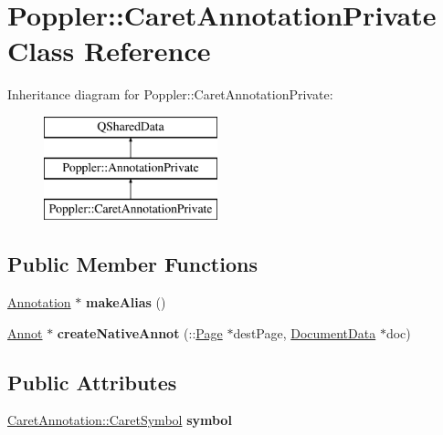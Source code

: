\hypertarget{class_poppler_1_1_caret_annotation_private}{}\section{Poppler\+:\+:Caret\+Annotation\+Private Class Reference}
\label{class_poppler_1_1_caret_annotation_private}
Inheritance diagram for Poppler\+:\+:Caret\+Annotation\+Private\+:\begin{figure}[H]
\begin{center}
\leavevmode
\includegraphics[height=3.000000cm]{class_poppler_1_1_caret_annotation_private}
\end{center}
\end{figure}
\subsection*{Public Member Functions}
\begin{DoxyCompactItemize}
\item 
\mbox{\label{class_poppler_1_1_caret_annotation_private_abfd2f73ff6e6a29321aae98d848281ed}} 
\hyperlink{class_poppler_1_1_annotation}{Annotation} $\ast$ {\bfseries make\+Alias} ()
\item 
\mbox{\label{class_poppler_1_1_caret_annotation_private_a1508cb16d1c94c3ecbc49f1d6f2beba6}} 
\hyperlink{class_annot}{Annot} $\ast$ {\bfseries create\+Native\+Annot} (\+::\hyperlink{class_poppler_1_1_page}{Page} $\ast$dest\+Page, \hyperlink{class_poppler_1_1_document_data}{Document\+Data} $\ast$doc)
\end{DoxyCompactItemize}
\subsection*{Public Attributes}
\begin{DoxyCompactItemize}
\item 
\mbox{\label{class_poppler_1_1_caret_annotation_private_af63cdd2f02b0dc0efa991dea39d6370d}} 
\hyperlink{class_poppler_1_1_caret_annotation_a391714f3129aad14eb4c2e4094f6410a}{Caret\+Annotation\+::\+Caret\+Symbol} {\bfseries symbol}
\end{DoxyCompactItemize}
